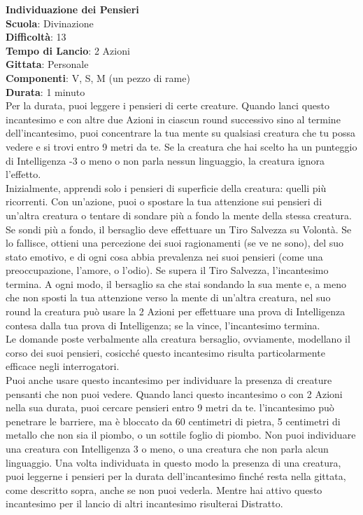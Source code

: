 \begin{multicols}{2}
\medskip\textbf{Individuazione dei Pensieri}\\
\textbf{Scuola}: Divinazione\\
\textbf{Difficoltà}:  13\\
\textbf{Tempo di Lancio}: 2 Azioni\\
\textbf{Gittata}: Personale\\
\textbf{Componenti}: V, S, M (un pezzo di rame)\\
\textbf{Durata}: 1 minuto\\
Per la durata, puoi leggere i pensieri di certe creature. Quando lanci questo incantesimo e con altre due Azioni in ciascun round successivo sino al termine dell'incantesimo, puoi concentrare la tua mente su qualsiasi creatura che tu possa vedere e si trovi entro 9 metri da te. Se la creatura che hai scelto ha un punteggio di Intelligenza -3 o meno o non parla nessun linguaggio, la creatura ignora l’effetto.\\
Inizialmente, apprendi solo i pensieri di superficie della creatura: quelli più ricorrenti. Con un'azione, puoi o spostare la tua attenzione sui pensieri di un'altra creatura o tentare di sondare più a fondo la mente della stessa creatura. Se sondi più a fondo, il bersaglio deve effettuare un Tiro Salvezza su Volontà. Se lo fallisce, ottieni una percezione dei suoi ragionamenti (se ve ne sono), del suo stato emotivo, e di ogni cosa abbia prevalenza nei suoi pensieri (come una preoccupazione, l’amore, o l’odio). Se supera il Tiro Salvezza, l'incantesimo termina. A ogni modo, il bersaglio sa che stai sondando la sua mente e, a meno che non sposti la tua attenzione verso la mente di un'altra creatura, nel suo round la creatura può usare la 2 Azioni per effettuare una prova di Intelligenza contesa dalla tua prova di Intelligenza; se la vince, l'incantesimo termina.\\
Le domande poste verbalmente alla creatura bersaglio, ovviamente, modellano il corso dei suoi pensieri, cosicché questo incantesimo risulta particolarmente efficace negli interrogatori.\\
Puoi anche usare questo incantesimo per individuare la presenza di creature pensanti che non puoi vedere. Quando lanci questo incantesimo o con 2 Azioni nella sua durata, puoi cercare pensieri entro 9 metri da te. l'incantesimo può penetrare le barriere, ma è bloccato da 60 centimetri di pietra, 5 centimetri di metallo che non sia il piombo, o un sottile foglio di piombo. Non puoi individuare una creatura con Intelligenza 3 o meno, o una creatura che non parla alcun linguaggio. Una volta individuata in questo modo la presenza di una creatura, puoi leggerne i pensieri per la durata dell'incantesimo finché resta nella gittata, come descritto sopra, anche se non puoi vederla.
Mentre hai attivo questo incantesimo per il lancio di altri incantesimo risulterai Distratto.


\end{multicols}
